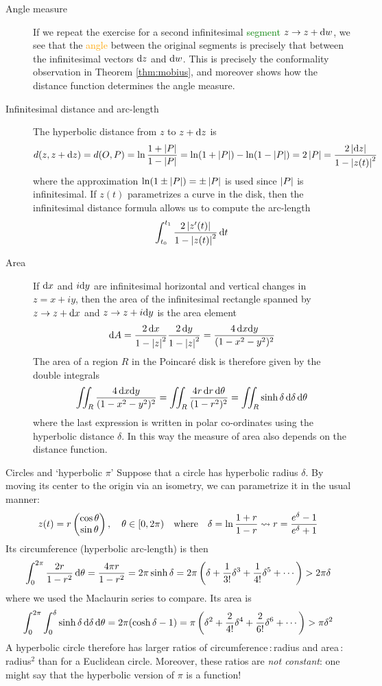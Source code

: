 \begin{description}
	\item[Angle measure]\label{pg:hypareaext} If we repeat the exercise for a second infinitesimal \textcolor{Green}{segment} $z\to z+{\mathrm{d} w}$, we see that the \textcolor{orange}{angle} between the original segments is precisely that between the infinitesimal vectors ${\mathrm{d} z}$ and ${\mathrm{d} w}$. This is precisely the conformality observation in Theorem \ref{thm:mobius}, and moreover shows how the distance function determines the angle measure.
	\item[Infinitesimal distance and arc-length] The hyperbolic distance from $z$ to $z+{\mathrm{d} z}$ is
	\[d(z,z+{\mathrm{d} z})=d(O,P)=\ln\frac{1+\left| P\right|}{1-\left| P\right|} =\ln(1+\left| P\right|)-\ln(1-\left| P\right|)=2\left| P\right|=\frac{2\left| {\mathrm{d} z}\right|}{1-\left| z(t)\right|^2}\]
	where the approximation $\ln(1\pm\left| P\right|)=\pm\left| P\right|$ is used since $\left| P\right|$ is infinitesimal.\smallbreak
	If $z(t)$ parametrizes a curve in the disk, then the infinitesimal distance formula allows us to compute the arc-length
	\[\int_{t_0}^{t_1}\frac{2\left| z'(t)\right|}{1-\left| z(t)\right|^2}\,{\mathrm{d} t}\]
	\item[Area] If ${\mathrm{d} x}$ and $i{\mathrm{d} y}$ are infinitesimal horizontal and vertical changes in $z=x+iy$, then the area of the infinitesimal rectangle spanned by $z\to z+{\mathrm{d} x}$ and $z\to z+i{\mathrm{d} y}$ is the area element
	\[{\mathrm{d} A}=\frac{2\,{\mathrm{d} x}}{1-\left| z\right|^2}\frac{2\,{\mathrm{d} y}}{1-\left| z\right|^2} =\frac{4\,{\mathrm{d} x}{\mathrm{d} y}}{(1-x^2-y^2)^2}\]
	The area of a region $R$ in the Poincaré disk is therefore given by the double integrals
	\[\iint_R\frac{4\,{\mathrm{d} x}{\mathrm{d} y}}{(1-x^2-y^2)^2}=\iint_R\frac{4r\,{\mathrm{d} r}\,{\mathrm{d}\theta}}{(1-r^2)^2} =\iint_R\sinh\delta\,\mathrm{d}\delta\,{\mathrm{d}\theta}\]
	where the last expression is written in polar co-ordinates using the hyperbolic distance $\delta$. In this way the measure of area also depends on the distance function.
\end{description}

\begin{example}{Circles and `hyperbolic $\pi$'}{}
Suppose that a circle has hyperbolic radius $\delta$. By moving its center to the origin via an isometry, we can parametrize it in the usual manner:
\[z(t)=r\begin{pmatrix}\cos\theta\\\sin\theta\end{pmatrix},\quad \theta\in[0,2\pi)\quad\text{where}\quad \delta=\ln\frac{1+r}{1-r}\rightsquigarrow r=\frac{e^\delta-1}{e^\delta+1}\]
Its circumference (hyperbolic arc-length) is then
\[\int_0^{2\pi}\frac{2 r}{1-r^2}\,{\mathrm{d}\theta}=\frac{4\pi r}{1-r^2}=2\pi\sinh\delta=2\pi\left(\delta+\frac{1}{3!}\delta^3+\frac{1}{4!}\delta^5+\cdots\right)>2\pi\delta\]
where we used the Maclaurin series to compare. Its area is
\[\int_0^{2\pi}\int_0^\delta\sinh\delta\,\mathrm{d}\delta\,{\mathrm{d}\theta} =2\pi(\cosh\delta-1)=\pi\left(\delta^2+\frac{2}{4!}\delta^4+\frac{2}{6!}\delta^6+\cdots\right)>\pi\delta^2\]
A hyperbolic circle therefore has larger ratios of circumference\,:\,radius and area\,:\,radius${}^2$ than for a Euclidean circle. Moreover, these ratios are \emph{not constant}: one might say that the hyperbolic version of $\pi$ is a function!
\end{example}

